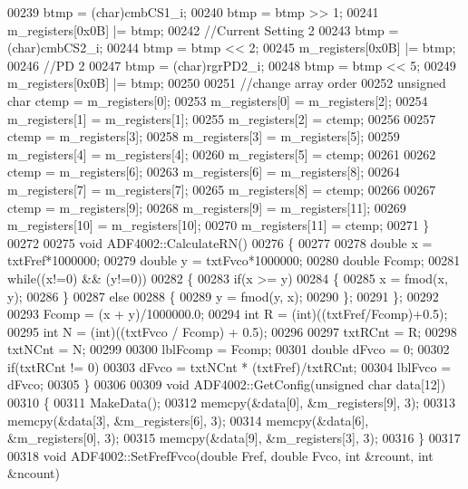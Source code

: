 \begin{DoxyCode}
00239     btmp = (char)cmbCS1_i;
00240     btmp = btmp >> 1;
00241     m_registers[0x0B] |= btmp;
00242     \textcolor{comment}{//Current Setting 2}
00243     btmp = (char)cmbCS2_i;
00244     btmp = btmp << 2;
00245     m_registers[0x0B] |= btmp;
00246     \textcolor{comment}{//PD 2}
00247     btmp = (char)rgrPD2_i;
00248     btmp = btmp << 5;
00249     m_registers[0x0B] |= btmp;
00250 
00251     \textcolor{comment}{//change array order}
00252     \textcolor{keywordtype}{unsigned} \textcolor{keywordtype}{char} ctemp = m_registers[0];
00253     m_registers[0] = m_registers[2];
00254     m_registers[1] = m_registers[1];
00255     m_registers[2] = ctemp;
00256 
00257     ctemp = m_registers[3];
00258     m_registers[3] = m_registers[5];
00259     m_registers[4] = m_registers[4];
00260     m_registers[5] = ctemp;
00261 
00262     ctemp = m_registers[6];
00263     m_registers[6] = m_registers[8];
00264     m_registers[7] = m_registers[7];
00265     m_registers[8] = ctemp;
00266 
00267     ctemp = m_registers[9];
00268     m_registers[9] = m_registers[11];
00269     m_registers[10] = m_registers[10];
00270     m_registers[11] = ctemp;
00271 \}
00272 
00275 \textcolor{keywordtype}{void} ADF4002::CalculateRN()
00276 \{
00277 
00278     \textcolor{keywordtype}{double} x = txtFref*1000000;
00279     \textcolor{keywordtype}{double} y = txtFvco*1000000;
00280     \textcolor{keywordtype}{double} Fcomp;
00281     \textcolor{keywordflow}{while}((x!=0) && (y!=0))
00282     \{
00283         \textcolor{keywordflow}{if}(x >= y)
00284         \{
00285             x = fmod(x, y);
00286         \}
00287         \textcolor{keywordflow}{else}
00288         \{
00289             y = fmod(y, x);
00290         \};
00291     \};
00292 
00293     Fcomp = (x + y)/1000000.0;
00294     \textcolor{keywordtype}{int} R = (int)((txtFref/Fcomp)+0.5);
00295     \textcolor{keywordtype}{int} N = (int)((txtFvco / Fcomp) + 0.5);
00296 
00297     txtRCnt = R;
00298     txtNCnt = N;
00299 
00300     lblFcomp = Fcomp;
00301     \textcolor{keywordtype}{double} dFvco = 0;
00302     \textcolor{keywordflow}{if}(txtRCnt != 0)
00303         dFvco = txtNCnt * (txtFref)/txtRCnt;
00304     lblFvco = dFvco;
00305 \}
00306 
00309 \textcolor{keywordtype}{void} ADF4002::GetConfig(\textcolor{keywordtype}{unsigned} \textcolor{keywordtype}{char} data[12])
00310 \{
00311     MakeData();
00312     memcpy(&data[0], &m_registers[9], 3);
00313     memcpy(&data[3], &m_registers[6], 3);
00314     memcpy(&data[6], &m_registers[0], 3);
00315     memcpy(&data[9], &m_registers[3], 3);
00316 \}
00317 
00318 \textcolor{keywordtype}{void} ADF4002::SetFrefFvco(\textcolor{keywordtype}{double} Fref, \textcolor{keywordtype}{double} Fvco, \textcolor{keywordtype}{int} &rcount, \textcolor{keywordtype}{int} &ncount)

\end{DoxyCode}
